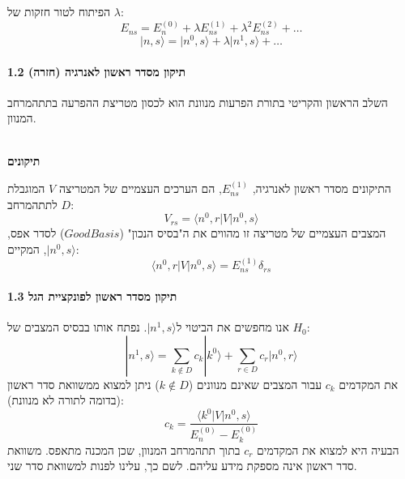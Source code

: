 הפיתוח לטור חזקות של $\lambda$:
$$ E_{ns} = E_n^{(0)} + \lambda E_{ns}^{(1)} + \lambda^2 E_{ns}^{(2)} + \dots $$
$$ |n, s\rangle = |n^0, s\rangle + \lambda |n^1, s\rangle + \dots $$

\paragraph{1.2 תיקון מסדר ראשון לאנרגיה (חזרה)}
השלב הראשון והקריטי בתורת הפרעות מנוונת הוא לכסון מטריצת ההפרעה בתתהמרחב המנוון.

\begin{resultbox}
\\
\textbf{תיקונים}

התיקונים מסדר ראשון לאנרגיה, $E_{ns}^{(1)}$, הם הערכים העצמיים של המטריצה $V$ המוגבלת לתתהמרחב $D$:
\[ V_{rs} = \langle n^0, r | V | n^0, s \rangle \]
המצבים העצמיים של מטריצה זו מהווים את ה"בסיס הנכון" ($Good Basis$) לסדר אפס, $|n^0, s\rangle$, המקיים:
\[ \langle n^0, r | V | n^0, s \rangle = E_{ns}^{(1)} \delta_{rs} \]
\end{resultbox}

\paragraph{1.3 תיקון מסדר ראשון לפונקציית הגל}
אנו מחפשים את הביטוי ל$|n^1, s\rangle$. נפתח אותו בבסיס המצבים של $H_0$:
\begin{equation}
|n^1, s\rangle = \sum_{k \notin D} c_k |k^0\rangle + \sum_{r \in D} c_r |n^0, r\rangle
\end{equation}
את המקדמים $c_k$ עבור המצבים שאינם מנוונים ($k \notin D$) ניתן למצוא ממשוואת סדר ראשון (בדומה לתורה לא מנוונת):
\[ c_k = \frac{\langle k^0 | V | n^0, s \rangle}{E_n^{(0)} - E_k^{(0)}} \]
הבעיה היא למצוא את המקדמים $c_r$ בתוך תתהמרחב המנוון, שכן המכנה מתאפס. משוואת סדר ראשון אינה מספקת מידע עליהם. לשם כך, עלינו לפנות למשוואת סדר שני.

